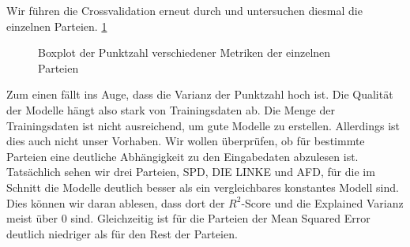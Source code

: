 \documentclass[a4paper,10pt]{scrartcl}
\begin{document}
 Wir führen die Crossvalidation erneut durch und untersuchen diesmal die einzelnen Parteien. \ref{fig:scores_parties} \begin{figure}
 	\centering
 	\caption{Boxplot der Punktzahl verschiedener Metriken der einzelnen Parteien}
 	\label{fig:scores_parties}\end{figure} Zum einen fällt ins Auge, dass die Varianz der Punktzahl hoch ist. Die Qualität der Modelle hängt also stark von Trainingsdaten ab. Die Menge der Trainingsdaten ist nicht ausreichend, um gute Modelle zu erstellen. Allerdings ist dies auch nicht unser Vorhaben. Wir wollen überprüfen, ob für bestimmte Parteien eine deutliche Abhängigkeit zu den Eingabedaten abzulesen ist. Tatsächlich sehen wir drei Parteien, SPD, DIE LINKE und AFD, für die im Schnitt die Modelle deutlich besser als ein vergleichbares konstantes Modell sind. Dies können wir daran ablesen, dass dort der $R^2$-Score und die Explained Varianz meist über 0 sind. Gleichzeitig ist für die Parteien der Mean Squared Error deutlich niedriger als für den Rest der Parteien. 
 
\end{document}
